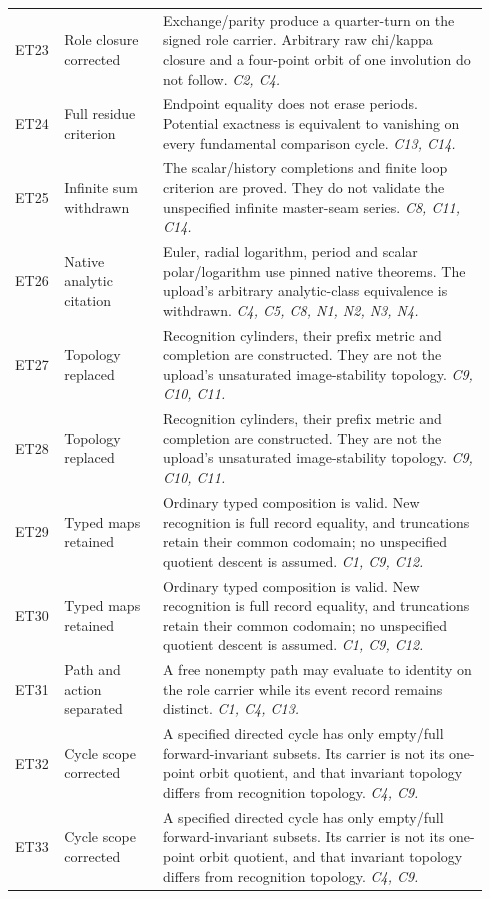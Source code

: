 \begin{longtable}{@{}>{\raggedright\arraybackslash}p{0.08\linewidth}>{\raggedright\arraybackslash}p{0.20\linewidth}>{\raggedright\arraybackslash}p{0.66\linewidth}@{}}
ET23 & Role closure corrected & Exchange/parity produce a quarter-turn on the signed role carrier. Arbitrary raw chi/kappa closure and a four-point orbit of one involution do not follow. \emph{C2, C4.} \\[5pt]
ET24 & Full residue criterion & Endpoint equality does not erase periods. Potential exactness is equivalent to vanishing on every fundamental comparison cycle. \emph{C13, C14.} \\[5pt]
ET25 & Infinite sum withdrawn & The scalar/history completions and finite loop criterion are proved. They do not validate the unspecified infinite master-seam series. \emph{C8, C11, C14.} \\[5pt]
ET26 & Native analytic citation & Euler, radial logarithm, period and scalar polar/logarithm use pinned native theorems. The upload's arbitrary analytic-class equivalence is withdrawn. \emph{C4, C5, C8, N1, N2, N3, N4.} \\[5pt]
ET27 & Topology replaced & Recognition cylinders, their prefix metric and completion are constructed. They are not the upload's unsaturated image-stability topology. \emph{C9, C10, C11.} \\[5pt]
ET28 & Topology replaced & Recognition cylinders, their prefix metric and completion are constructed. They are not the upload's unsaturated image-stability topology. \emph{C9, C10, C11.} \\[5pt]
ET29 & Typed maps retained & Ordinary typed composition is valid. New recognition is full record equality, and truncations retain their common codomain; no unspecified quotient descent is assumed. \emph{C1, C9, C12.} \\[5pt]
ET30 & Typed maps retained & Ordinary typed composition is valid. New recognition is full record equality, and truncations retain their common codomain; no unspecified quotient descent is assumed. \emph{C1, C9, C12.} \\[5pt]
ET31 & Path and action separated & A free nonempty path may evaluate to identity on the role carrier while its event record remains distinct. \emph{C1, C4, C13.} \\[5pt]
ET32 & Cycle scope corrected & A specified directed cycle has only empty/full forward-invariant subsets. Its carrier is not its one-point orbit quotient, and that invariant topology differs from recognition topology. \emph{C4, C9.} \\[5pt]
ET33 & Cycle scope corrected & A specified directed cycle has only empty/full forward-invariant subsets. Its carrier is not its one-point orbit quotient, and that invariant topology differs from recognition topology. \emph{C4, C9.} \\[5pt]

\end{longtable}
